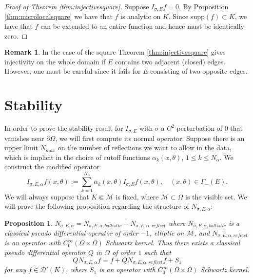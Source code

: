 \documentclass[10pt]{amsart}
\newtheorem{proposition}{Proposition}
\theoremstyle{definition}
\theoremstyle{definition}
\newtheorem{remark*}{Remark}
\theoremstyle{definition}
\begin{document}
\begin{proof}[Proof of Theorem \ref{thm:injectivesquare}] Suppose $I_{\sigma, E}f = 0$. By Proposition \ref{thm:microlocalsquare} we have that $f$ is analytic on $K$. Since $\mathrm{supp}(f) \subset K$, we have that $f$ can be extended to an entire function and hence must be identically zero.\end{proof}

\begin{remark*}In the case of the square Theorem \ref{thm:injectivesquare} gives injectivity on the whole domain if $E$ contains two adjacent (closed) edges. However, one must be careful since it fails for $E$ consisting of two opposite edges. \end{remark*}

\section{Stability \label{sec:stability}}
In order to prove the stability result for $I_{\sigma,E}$ with $\sigma$ a $C^{2}$ perturbation of $0$ that vanishes near $\partial \Omega$, we will first compute its normal operator. Suppose there is an upper limit $N_{max}$ on the number of reflections we want to allow in the data, which is implicit in the choice of cutoff functions $\alpha_{k}(x,\theta)$, $1 \leq k \leq N_{\alpha}$. We construct the modified operator
\begin{equation}
I_{\sigma,E,\alpha}f(x,\theta) := \sum_{k=1}^{N_{\alpha}}\alpha_{k}(x,\theta)I_{\sigma,E}f(x,\theta), \quad (x,\theta) \in \Gamma_{-}(E).
\end{equation}
We will always suppose that $K \Subset \mathcal{M}$ is fixed, where $\mathcal{M} \subset \Omega$ is the visible set. We will prove the following proposition regarding the structure of $N_{\sigma,E,\alpha}$:
\begin{proposition}$N_{\sigma,E,\alpha} = N_{\sigma,E,\alpha,ballistic} + N_{\sigma,E,\alpha,reflect}$ where $N_{\sigma,E,\alpha,ballistic}$ is a classical pseudo differential operator of order $-1$, elliptic on $\mathcal{M}$, and $N_{\sigma, E,\alpha,reflect}$ is an operator with $C_{0}^{\infty}(\Omega \times \Omega)$ Schwartz kernel. Thus there exists a classical pseudo differential operator $Q$ in $\Omega$ of order $1$ such that
\begin{equation}
QN_{\sigma, E,\alpha}f = f + QN_{\sigma,E,\alpha,reflect}f + S_{1}
\end{equation}
for any $f \in \mathcal{D}'(K)$, where $S_{1}$ is an operator with $C_{0}^{\infty}(\Omega \times \Omega)$ Schwartz kernel. \label{prop:normaldecomposition}\end{proposition}
\end{document}
